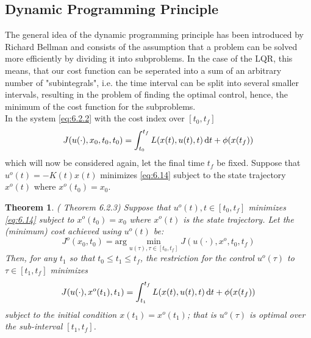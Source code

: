 \documentclass[paper=a4, pagesize, DIV=calc, BCOR=12.5mm, twoside=on, onecolumn=on, open = any, titlepage =on, parskip =half-, headsepline = on, footsepline = on, chapterprefix = on, appendixprefix = off, fontsize = 12pt, numbers = noenddot, abstract = on]{scrbook}
\numberwithin{equation}{chapter}
\theoremstyle{definition}
\theoremstyle{plain}
\theoremstyle{plain}
\newtheorem{satz}{Theorem}
\theoremstyle{remark}
\theoremstyle{plain}
\theoremstyle{plain}
\begin{document}
\subsection{Dynamic Programming Principle}
\onehalfspacing 
The general idea of the dynamic programming principle has been introduced by Richard Bellman and consists of the assumption that a problem can be solved more efficiently by dividing it into subproblems. In the case of the LQR, this means, that our cost function can be seperated into a sum of an arbitrary number of  "subintegrals", i.e. the time interval can be split into several smaller intervals, resulting in the problem of finding the optimal control, hence, the minimum of the cost function for the subproblems.\\ %
In the system \eqref{eq:6.2.2} with the cost index over $\left[ t_0, t_f \right]$
\begin{equation}
   J(u(\cdot), x_0, t_0, t_0) = \int_{t_0}^{t_f} L(x(t), u(t), t) \mathop{}\!\mathrm{d} t + \phi(x(t_f)) \label{eq:6.14}
\end{equation} which will now be considered again, let the final time $t_f$ be fixed. Suppose that $u^o(t) = -K(t)x(t)$ minimizes \eqref{eq:6.14} subject to the state trajectory $x^o(t)$ where $x^o(t_0) = x_0$.

\begin{satz} (\cite{li:2006} Theorem 6.2.3) \label{thm: 6.2.3} \newline
Suppose that $u^o(t), t \in \left[ t_0, t_f \right]$ minimizes \eqref{eq:6.14} subject to $x^o(t_0) = x_0$ where $x^o(t)$ is the state trajectory. Let the (minimum) cost achieved using $u^o(t)$ be: 
\[
J^o(x_0, t_0) = \mathrm{arg} \min_{u(\tau), \tau \in \left[ t_0, t_f \right]} J(u(\cdot), x^o, t_0, t_f)
\]
Then, for any $t_1$ so that $t_0 \le t_1 \le t_f$, the restriction for the control $u^o(\tau)$ to $\tau  \in \left[ t_1, t_f \right]$ minimizes 
\[
J(u(\cdot), x^o(t_1), t_1) = \int_{t_1}^{t_f} L(x(t),u(t),t) \mathop{}\!\mathrm{d} t + \phi(x(t_f))
\]
subject to the initial condition $x(t_1) = x^o(t_1)$; that is $u^o(\tau)$ is optimal over the sub-interval $\left[ t_1, t_f \right]$.
\end{satz}
\end{document}
